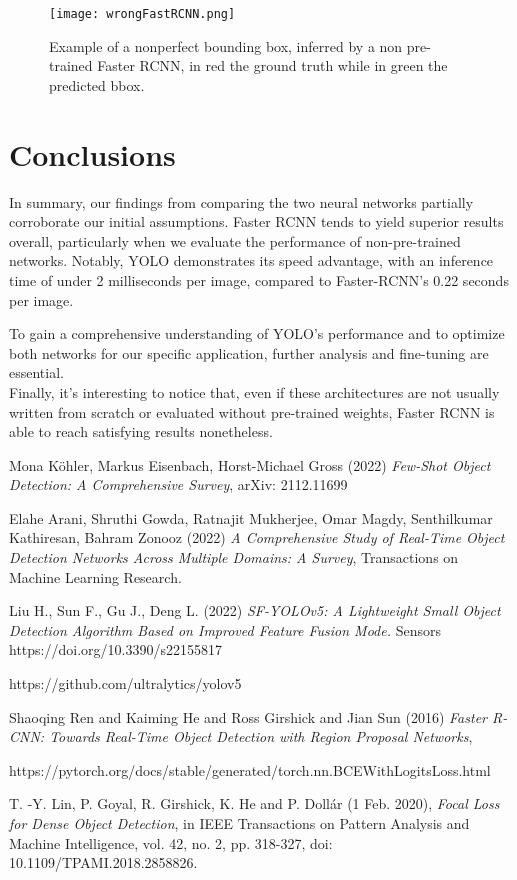 \begin{figure}[h!]
  \centering
  \texttt{[image: wrongFastRCNN.png]}
  \caption{Example of a nonperfect bounding box, inferred by a non pre-trained Faster RCNN, in red the ground truth while in green the predicted bbox.}
  \label{fig:wrondFRCNN}
\end{figure}

\section{Conclusions}
In summary, our findings from comparing the two neural networks partially corroborate our initial assumptions. Faster RCNN tends to yield superior results overall, particularly when we evaluate the performance of non-pre-trained networks. Notably, YOLO demonstrates its speed advantage, with an inference time of under 2 milliseconds per image, compared to Faster-RCNN's 0.22 seconds per image.

To gain a comprehensive understanding of YOLO's performance and to optimize both networks for our specific application, further analysis and fine-tuning are essential.\\
Finally, it's interesting to notice that, even if these architectures are not usually written from scratch or evaluated without pre-trained weights, Faster RCNN is able to reach satisfying results nonetheless.
\newpage
\begin{thebibliography}{9}

Mona Köhler, Markus Eisenbach, Horst-Michael Gross (2022) \emph{Few-Shot Object Detection: A Comprehensive Survey}, arXiv: 2112.11699

Elahe Arani, Shruthi Gowda, Ratnajit Mukherjee, Omar Magdy, Senthilkumar Kathiresan, Bahram Zonooz (2022) \emph{A Comprehensive Study of Real-Time Object Detection Networks Across Multiple Domains: A Survey}, Transactions on Machine Learning Research.

Liu H., Sun F., Gu J., Deng L. (2022) \emph{SF-YOLOv5: A Lightweight Small Object Detection Algorithm Based on Improved Feature Fusion Mode.}
Sensors https://doi.org/10.3390/s22155817

https://github.com/ultralytics/yolov5

Shaoqing Ren and Kaiming He and Ross Girshick and Jian Sun (2016) \emph{Faster R-CNN: Towards Real-Time Object Detection with Region Proposal Networks},

https://pytorch.org/docs/stable/generated/torch.nn.BCEWithLogitsLoss.html

T. -Y. Lin, P. Goyal, R. Girshick, K. He and P. Dollár (1 Feb. 2020), \emph{Focal Loss for Dense Object Detection}, in IEEE Transactions on Pattern Analysis and Machine Intelligence, vol. 42, no. 2, pp. 318-327, doi: 10.1109/TPAMI.2018.2858826.

\end{thebibliography}


